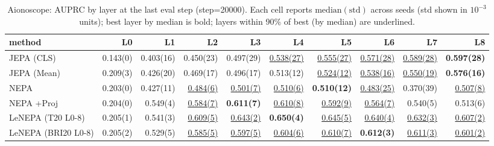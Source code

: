 \begin{table}[t]
\centering
\scriptsize
\caption{Aionoscope: AUPRC by layer at the last eval step (step=20000). Each cell reports $\mathrm{median}(\mathrm{std})$ across seeds (std shown in $10^{-3}$ units); best layer by median is bold; layers within 90\% of best (by median) are underlined.}
\label{tab:aiono_last_step_by_layer_auprc}
\begin{tabular}{lrrrrrrrrr}
\toprule
method & L0 & L1 & L2 & L3 & L4 & L5 & L6 & L7 & L8 \\
\midrule
JEPA (CLS) & 0.143(0) & 0.403(16) & 0.450(23) & 0.497(29) & \underline{0.538(27)} & \underline{0.555(27)} & \underline{0.571(28)} & \underline{0.589(28)} & \textbf{0.597(28)} \\
JEPA (Mean) & 0.209(3) & 0.426(20) & 0.469(17) & 0.496(17) & 0.513(12) & \underline{0.524(12)} & \underline{0.538(16)} & \underline{0.550(19)} & \textbf{0.576(16)} \\
NEPA & 0.203(0) & 0.427(11) & \underline{0.484(6)} & \underline{0.501(7)} & \underline{0.510(6)} & \textbf{0.510(12)} & \underline{0.483(25)} & 0.370(39) & \underline{0.507(8)} \\
NEPA +Proj & 0.204(0) & 0.549(4) & \underline{0.584(7)} & \textbf{0.611(7)} & \underline{0.610(8)} & \underline{0.592(9)} & \underline{0.564(7)} & 0.540(5) & 0.513(6) \\
LeNEPA (T20 L0-8) & 0.205(1) & 0.541(3) & \underline{0.609(5)} & \underline{0.643(2)} & \textbf{0.650(4)} & \underline{0.645(5)} & \underline{0.640(4)} & \underline{0.632(3)} & \underline{0.607(2)} \\
LeNEPA (BRI20 L0-8) & 0.205(2) & 0.529(5) & \underline{0.585(5)} & \underline{0.597(5)} & \underline{0.604(6)} & \underline{0.610(7)} & \textbf{0.612(3)} & \underline{0.611(3)} & \underline{0.601(2)} \\
\bottomrule
\end{tabular}
\end{table}
